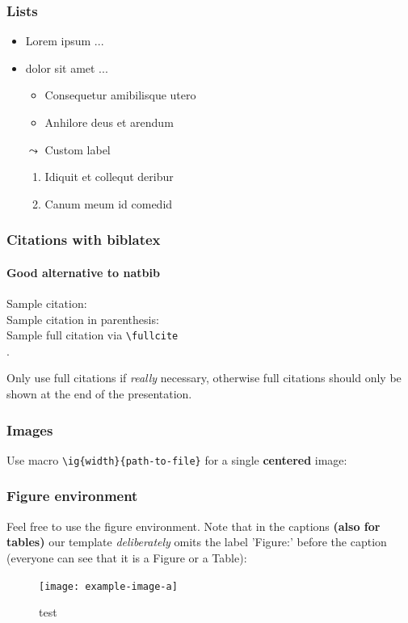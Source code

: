 \documentclass[t,english]{beamer}
\begin{document}
\begin{frame}
  \frametitle{Lists}

  \begin{itemize}[<+->]
    \item Lorem ipsum ...
    \item dolor sit amet ...
    \begin{itemize}
      \item Consequetur amibilisque utero
      \item Anhilore deus et arendum
    \end{itemize}
    \item[$\leadsto$] Custom label
    \begin{enumerate}
      \item Idiquit et collequt deribur
      \item Canum meum id comedid
    \end{enumerate}
  \end{itemize}

\end{frame}

\begin{frame}[fragile]
  \frametitle{Citations with biblatex}
  \framesubtitle{Good alternative to natbib}

  Sample citation:~\cite{BNPS2019}\\
  Sample citation in parenthesis:~\parencite{BNPS2019}\\
  Sample full citation via \verb|\fullcite|\\[0.5cm]
  .\\[0.5cm]

  \bigskip

  Only use full citations if \textit{really} necessary, otherwise full citations should only be shown at the end of the presentation.

\end{frame}

\begin{frame}[fragile]
  \frametitle{Images}

  Use macro \verb|\ig{width}{path-to-file}| for a single \textbf{centered} image:
\end{frame}


\begin{frame}
  \frametitle{Figure environment}

  Feel free to use the figure environment. Note that in the captions \textbf{(also for tables)} our template \textit{deliberately} omits the label 'Figure:' before the caption (everyone can see that it is a Figure or a Table):

  \begin{figure}[H]
    \texttt{[image: example-image-a]}
    \caption{test}
  \end{figure}

\end{frame}
\end{document}
